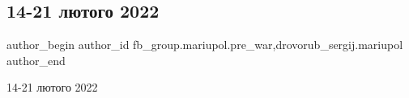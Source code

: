  
 
 
 
 

\subsection{14-21 лютого 2022}
\label{sec:13_02_2023.fb.fb_group.mariupol.pre_war.2.14_21_lyutogo_2022}
 
\ifcmt
 author_begin
   author_id fb_group.mariupol.pre_war,drovorub_sergij.mariupol
 author_end
\fi

14-21 лютого 2022


